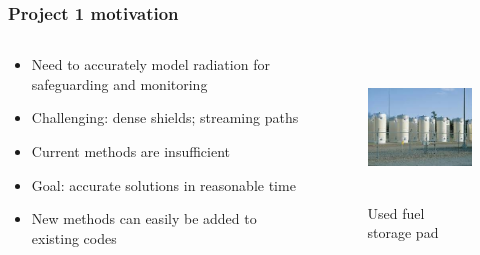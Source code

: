 \documentclass[xcolor=x11names,compress,handout]{beamer}
\renewcommand{\(}{\begin{columns}}
\renewcommand{\)}{\end{columns}}
\newcommand{\<}[1]{\begin{column}{#1}}
\renewcommand{\>}{\end{column}}
\newcommand{\ve}[1]{\ensuremath{\vec{#1}}}
\begin{document}
\begin{frame}[fragile]
  \frametitle{Project 1 motivation}

\begin{columns}
  \begin{column}{0.55\textwidth}
	\begin{itemize}
	\item Need to accurately model radiation for safeguarding and monitoring
	\item \alert{Challenging}: dense shields; streaming paths
	\item Current methods are insufficient
	\item \alert{Goal}: accurate solutions in reasonable time
	\item New methods can easily be added to existing codes
	\end{itemize}
  \end{column}
  \begin{column}{0.45\textwidth}
  	\begin{figure}
  	\begin{center}
  		\includegraphics[height=1.5in,clip]{../figs/isfsi}
		\caption{Used fuel storage pad}
	\end{center}
  	\end{figure}
  \end{column}
\end{columns}

\end{frame}
\end{document}

